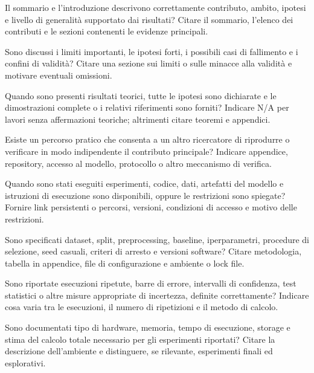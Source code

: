 \begin{reproducibilitychecklist}

{Il sommario e l'introduzione descrivono correttamente contributo, ambito,
ipotesi e livello di generalit\`a supportato dai risultati?}
{Citare il sommario, l'elenco dei contributi e le sezioni contenenti le evidenze principali.}

{Sono discussi i limiti importanti, le ipotesi forti, i possibili casi di
fallimento e i confini di validit\`a?}
{Citare una sezione sui limiti o sulle minacce alla validit\`a e motivare eventuali omissioni.}

{Quando sono presenti risultati teorici, tutte le ipotesi sono dichiarate e le
dimostrazioni complete o i relativi riferimenti sono forniti?}
{Indicare N/A per lavori senza affermazioni teoriche; altrimenti citare teoremi e appendici.}

{Esiste un percorso pratico che consenta a un altro ricercatore di riprodurre o
verificare in modo indipendente il contributo principale?}
{Indicare appendice, repository, accesso al modello, protocollo o altro meccanismo di verifica.}

{Quando sono stati eseguiti esperimenti, codice, dati, artefatti del modello e
istruzioni di esecuzione sono disponibili, oppure le restrizioni sono spiegate?}
{Fornire link persistenti o percorsi, versioni, condizioni di accesso e motivo delle restrizioni.}

{Sono specificati dataset, split, preprocessing, baseline, iperparametri,
procedure di selezione, seed casuali, criteri di arresto e versioni software?}
{Citare metodologia, tabella in appendice, file di configurazione e ambiente o lock file.}

{Sono riportate esecuzioni ripetute, barre di errore, intervalli di confidenza,
test statistici o altre misure appropriate di incertezza, definite correttamente?}
{Indicare cosa varia tra le esecuzioni, il numero di ripetizioni e il metodo di calcolo.}

{Sono documentati tipo di hardware, memoria, tempo di esecuzione, storage e
stima del calcolo totale necessario per gli esperimenti riportati?}
{Citare la descrizione dell'ambiente e distinguere, se rilevante, esperimenti finali ed esplorativi.}


\end{reproducibilitychecklist}
